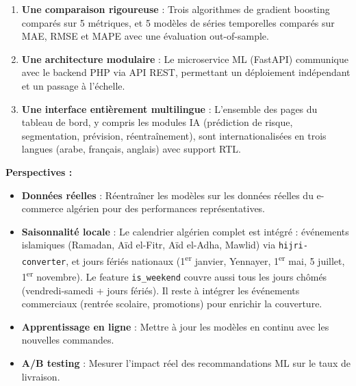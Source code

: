 \documentclass[12pt,a4paper]{report}
\begin{document}
\begin{enumerate}
  \item \textbf{Une comparaison rigoureuse} : Trois algorithmes de gradient boosting compar\'{e}s sur 5 m\'{e}triques, et 5 mod\`{e}les de s\'{e}ries temporelles compar\'{e}s sur MAE, RMSE et MAPE avec une \'{e}valuation out-of-sample.

  \item \textbf{Une architecture modulaire} : Le microservice ML (FastAPI) communique avec le backend PHP via API REST, permettant un d\'{e}ploiement ind\'{e}pendant et un passage \`{a} l'\'{e}chelle.

  \item \textbf{Une interface enti\`{e}rement multilingue} : L'ensemble des pages du tableau de bord, y compris les modules IA (pr\'{e}diction de risque, segmentation, pr\'{e}vision, r\'{e}entra\^{i}nement), sont internationalis\'{e}es en trois langues (arabe, fran\c{c}ais, anglais) avec support RTL.
\end{enumerate}

\textbf{Perspectives :}

\begin{itemize}
  \item \textbf{Donn\'{e}es r\'{e}elles} : R\'{e}entra\^{i}ner les mod\`{e}les sur les donn\'{e}es r\'{e}elles du e-commerce alg\'{e}rien pour des performances repr\'{e}sentatives.
  \item \textbf{Saisonnalit\'{e} locale} : Le calendrier alg\'{e}rien complet est int\'{e}gr\'{e} : \'{e}v\'{e}nements islamiques (Ramadan, A\"{i}d el-Fitr, A\"{i}d el-Adha, Mawlid) via \texttt{hijri-converter}, et jours f\'{e}ri\'{e}s nationaux (1\textsuperscript{er} janvier, Yennayer, 1\textsuperscript{er} mai, 5 juillet, 1\textsuperscript{er} novembre). Le feature \texttt{is\_weekend} couvre aussi tous les jours ch\^{o}m\'{e}s (vendredi-samedi + jours f\'{e}ri\'{e}s). Il reste \`{a} int\'{e}grer les \'{e}v\'{e}nements commerciaux (rentr\'{e}e scolaire, promotions) pour enrichir la couverture.
  \item \textbf{Apprentissage en ligne} : Mettre \`{a} jour les mod\`{e}les en continu avec les nouvelles commandes.
  \item \textbf{A/B testing} : Mesurer l'impact r\'{e}el des recommandations ML sur le taux de livraison.
\end{itemize}
\end{document}
